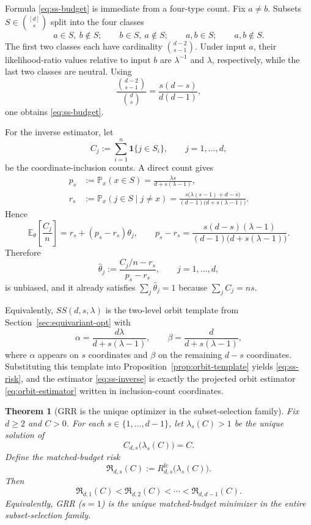 \documentclass[11pt]{amsart}
\numberwithin{equation}{section}
\newtheorem{theorem}{Theorem}[section]
\theoremstyle{definition}
\newcommand{\E}{\mathbb E}
\newcommand{\PP}{\mathbb P}
\newcommand{\one}{\mathbf 1}
\begin{document}
Formula \eqref{eq:ss-budget} is immediate from a four-type count.
Fix \(a\neq b\).
Subsets \(S\in\binom{[d]}{s}\) split into the four classes
\[
a\in S,\ b\notin S;\qquad
b\in S,\ a\notin S;\qquad
a,b\in S;\qquad
a,b\notin S.
\]
The first two classes each have cardinality \(\binom{d-2}{s-1}\).
Under input \(a\), their likelihood-ratio values relative to input \(b\) are
\(\lambda^{-1}\) and \(\lambda\), respectively, while the last two classes are neutral.
Using
\[
\frac{\binom{d-2}{s-1}}{\binom ds}
=
\frac{s(d-s)}{d(d-1)},
\]
one obtains \eqref{eq:ss-budget}.

For the inverse estimator, let
\[
C_j:=\sum_{i=1}^n \one\{j\in S_i\},
\qquad j=1,\dots,d,
\]
be the coordinate-inclusion counts.
A direct count gives
\[
\begin{aligned}
p_s&:=\PP_x(x\in S)=\frac{\lambda s}{d+s(\lambda-1)},\\
r_s&:=\PP_x(j\in S\mid j\neq x)
=
\frac{s\bigl(\lambda(s-1)+d-s\bigr)}
{(d-1)\bigl(d+s(\lambda-1)\bigr)}.
\end{aligned} \tag{12.4}\label{eq:ss-pr}
\]
Hence
\[
\E_\theta\!\left[\frac{C_j}{n}\right]
=
r_s+(p_s-r_s)\theta_j,
\qquad
p_s-r_s
=
\frac{s(d-s)(\lambda-1)}
{(d-1)\bigl(d+s(\lambda-1)\bigr)}. \tag{12.5}\label{eq:ss-gap}
\]
Therefore
\[
\widehat\theta_j
:=
\frac{C_j/n-r_s}{p_s-r_s},
\qquad j=1,\dots,d, \tag{12.6}\label{eq:ss-inverse}
\]
is unbiased, and it already satisfies \(\sum_j \widehat\theta_j=1\) because \(\sum_j C_j=ns\).

Equivalently, \(SS(d,s,\lambda)\) is the two-level orbit template from
Section~\ref{sec:equivariant-opt} with
\[
\alpha=\frac{d\lambda}{d+s(\lambda-1)},
\qquad
\beta=\frac{d}{d+s(\lambda-1)},
\]
where \(\alpha\) appears on \(s\) coordinates and \(\beta\) on the remaining \(d-s\) coordinates.
Substituting this template into Proposition~\ref{prop:orbit-template} yields
\eqref{eq:ss-risk}, and the estimator \eqref{eq:ss-inverse} is exactly the projected orbit estimator
\eqref{eq:orbit-estimator} written in inclusion-count coordinates.

\begin{theorem}[GRR is the unique optimizer in the subset-selection family]\label{thm:ss-opt}
Fix \(d\ge 2\) and \(C>0\).
For each \(s\in\{1,\dots,d-1\}\), let \(\lambda_s(C)>1\) be the unique solution of
\[
C_{d,s}\bigl(\lambda_s(C)\bigr)=C. \tag{12.7}\label{eq:ss-lam}
\]
Define the matched-budget risk
\[
\mathfrak R_{d,s}(C):=R^{\mathrm{fc}}_{d,s}\bigl(\lambda_s(C)\bigr). \tag{12.8}\label{eq:ss-matched-risk}
\]
Then
\[
\mathfrak R_{d,1}(C)<\mathfrak R_{d,2}(C)<\cdots<\mathfrak R_{d,d-1}(C). \tag{12.9}\label{eq:ss-monotone}
\]
Equivalently, GRR (\(s=1\)) is the unique matched-budget minimizer in the entire subset-selection family.
\end{theorem}
\end{document}
